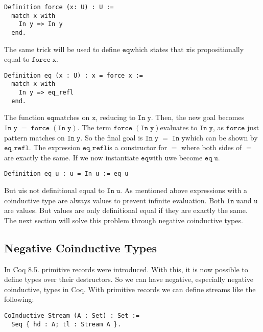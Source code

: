 \documentclass[a4paper,cleardoubleempty,BCOR1cm]{scrbook}
\begin{document}
\begin{verbatim}
Definition force (x: U) : U :=
  match x with
    In y => In y
  end.
\end{verbatim}

The same trick will be used to define $\mathtt{eq}$\;which states that $\mathtt{x}$\;is
propositionally equal to $\mathtt{force\;x}$.

\begin{verbatim}
Definition eq (x : U) : x = force x :=
  match x with
    In y => eq_refl
  end.
\end{verbatim}

The function $\mathtt{eq}$\;matches on $\mathtt{x}$, reducing to $\mathtt{In\;y}$. Then, the new goal
becomes $\mathtt{In\;y\;=\;force\;(In\;y)}$. The term $\mathtt{force\;(In\;y)}$\;evaluates to $\mathtt{In\;y}$, as $\mathtt{force}$
just pattern matches on $\mathtt{In\;y}$. So the final goal is $\mathtt{In\;y\;=\;In\;y}$\;which
can be shown by $\mathtt{eq\_refl}$. The expression $\mathtt{eq\_refl}$\;is a constructor for $\mathtt{=}$
where both sides of $\mathtt{=}$\;are exactly the same. If we now instantiate $\mathtt{eq}$\;with
$\mathtt{u}$\;we become $\mathtt{eq\;u}$.

\begin{verbatim}
Definition eq_u : u = In u := eq u
\end{verbatim}

But $\mathtt{u}$\;is not definitional equal to $\mathtt{In\;u}$.  As mentioned above expressions
with a coinductive type are always values to prevent infinite evaluation.
Both $\mathtt{In\;u}$\;and $\mathtt{u}$\;are values. But values are only
definitional equal if they are exactly the same.  The next section will
solve this problem through negative coinductive types.

\subsection{Negative Coinductive Types}
\label{sec:org11132db}
In Coq 8.5. primitive records were introduced. With this, it is now possible
to define types over their destructors. So we can have negative, especially
negative coinductive, types in Coq. With primitive records we can define
streams like the following:

\begin{verbatim}
CoInductive Stream (A : Set) : Set :=
  Seq { hd : A; tl : Stream A }.
\end{verbatim}
\end{document}
